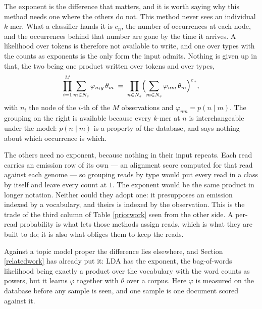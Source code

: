 \documentclass[pdflatex,sn-vancouver-num]{sn-jnl}
\begin{document}
    The exponent is the difference that matters, and it is worth saying why this method needs one
    where the others do not. This method never sees an individual $k$-mer. What a classifier hands
    it is $c_n$, the number of occurrences at each node, and the occurrences behind that number are
    gone by the time it arrives. A likelihood over tokens is therefore not available to write, and
    one over types with the counts as exponents is the only form the input admits. Nothing is given
    up in that, the two being one product written over tokens and over types,
    \begin{equation*}
        \prod_{i=1}^{M} \sum_{m \in N_s} \varphi_{n_i g}\, \theta_m
        \;=\;
        \prod_{n \in N_s} \Bigl( \sum_{m \in N_s} \varphi_{nm}\, \theta_m \Bigr)^{c_n} ,
    \end{equation*}
    with $n_i$ the node of the $i$-th of the $M$ observations and
    $\varphi_{nm} = p(n \mid m)$. The grouping on the right is available because every $k$-mer at
    $n$ is interchangeable under the model: $p(n \mid m)$ is a property of the database, and says
    nothing about which occurrence is which.

    The others need no exponent, because nothing in their input repeats. Each read carries an
    emission row of its own --- an alignment score computed for that read against each genome --- so
    grouping reads by type would put every read in a class by itself and leave every count at $1$.
    The exponent would be the same product in longer notation. Neither could they adopt one: it
    presupposes an emission indexed by a vocabulary, and theirs is indexed by the observation. This
    is the trade of the third column of Table \ref{priorwork} seen from the other side. A per-read
    probability is what lets those methods assign reads, which is what they are built to do; it is
    also what obliges them to keep the reads.

    Against a topic model proper the difference lies elsewhere, and Section \ref{relatedwork} has
    already put it: LDA has the exponent, the bag-of-words likelihood being exactly a product over
    the vocabulary with the word counts as powers, but it learns $\varphi$ together with $\theta$
    over a corpus. Here $\varphi$ is measured on the database before any sample is seen, and one
    sample is one document scored against it.
\end{document}
